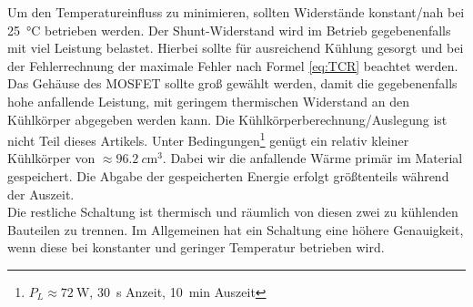 Um den Temperatureinfluss zu minimieren, sollten Widerstände konstant/nah bei \SI{25}{\celsius} betrieben werden. 
Der Shunt-Widerstand wird im Betrieb gegebenenfalls mit viel Leistung belastet. 
Hierbei sollte für ausreichend Kühlung gesorgt 
und bei der Fehlerrechnung der maximale Fehler nach Formel \ref{eq:TCR} beachtet werden.
Das Gehäuse des MOSFET sollte groß gewählt werden, damit die gegebenenfalls hohe anfallende 
Leistung, mit geringem thermischen Widerstand an den Kühlkörper abgegeben werden kann.
Die Kühlkörperberechnung/Auslegung ist nicht Teil dieses Artikels. 
Unter Bedingungen\footnote{$P_{L} \approx \SI{72}{\watt}$, \SI{30}{\second} Anzeit, \SI{10}{\minute} Auszeit} 
genügt ein relativ kleiner Kühlkörper von $\approx \SI{96,2}{c\meter^3}$.
Dabei wir die anfallende Wärme primär im Material gespeichert. 
Die Abgabe der gespeicherten Energie erfolgt größtenteils während der Auszeit.\\

Die restliche Schaltung ist thermisch und räumlich von diesen zwei zu kühlenden Bauteilen zu trennen.
Im Allgemeinen hat ein Schaltung eine höhere Genauigkeit, wenn diese bei konstanter und 
geringer Temperatur betrieben wird.